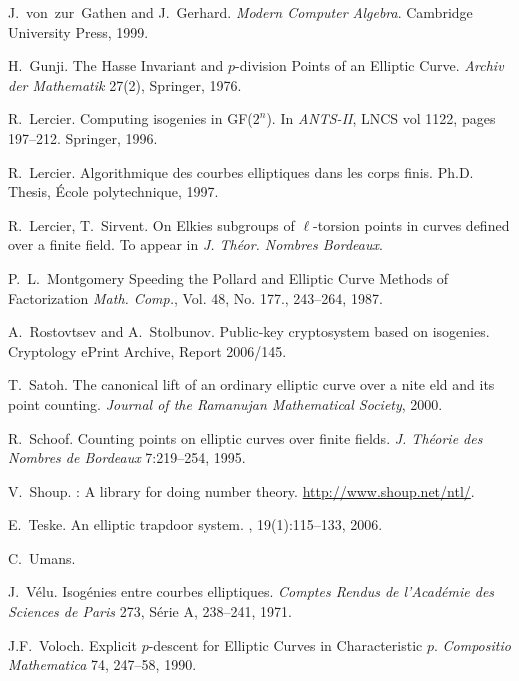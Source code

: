 \begin{thebibliography}{10}
  J.~von~zur~Gathen and J.~Gerhard. 
  \newblock \emph{Modern Computer Algebra}. 
  \newblock Cambridge University Press, 1999.

H.~Gunji.
    \newblock The Hasse Invariant and $p$-division Points of an Elliptic Curve.
  \newblock \emph{Archiv der Mathematik} 27(2), Springer, 1976.

  R.~Lercier.
  \newblock Computing isogenies in GF($2^n$).
  \newblock In {\em ANTS-II}, LNCS vol 1122, pages 197--212. Springer, 1996.

  R.~Lercier.
  \newblock Algorithmique des courbes elliptiques dans les corps finis. 
  \newblock Ph.D. Thesis, {\'E}cole polytechnique, 1997.

  R.~Lercier, T.~Sirvent.
  \newblock On Elkies subgroups of $\ell$-torsion points in curves defined over
  a finite field.
  \newblock To appear in {\em J. Th\'eor. Nombres Bordeaux}.

  P.~L.~Montgomery
  \newblock Speeding the Pollard and Elliptic Curve Methods of Factorization
  \newblock \emph{Math. Comp.}, Vol. 48, No. 177., 243--264, 1987.

  A.~Rostovtsev and A.~Stolbunov.
  \newblock Public-key cryptosystem based on isogenies.
  \newblock Cryptology ePrint Archive, Report 2006/145.
  
  T.~Satoh.
  \newblock The canonical lift of an ordinary elliptic curve over a nite eld and its point counting.
  \newblock \emph{Journal of the Ramanujan Mathematical Society}, 2000.

  R.~Schoof.
  \newblock Counting points on elliptic curves over finite fields.
  \newblock \emph{J. Théorie des Nombres de Bordeaux} 7:219--254, 1995.

  V.~Shoup.
  : A library for doing number theory.
  \newblock \url{http://www.shoup.net/ntl/}.

  E.~Teske.
  \newblock An elliptic trapdoor system.
  , 19(1):115--133, 2006.

  C.~Umans.
  \newblock \todo
  \newblock \todo

J.~Vélu.
  \newblock Isogénies entre courbes elliptiques.
  \newblock \emph{Comptes Rendus de l'Académie des Sciences de Paris} 273,
  Série A, 238--241, 1971.

J.F.~Voloch.
  \newblock Explicit $p$-descent for Elliptic Curves in Characteristic $p$.
  \newblock \emph{Compositio Mathematica} 74, 247--58, 1990.
  
\end{thebibliography}
